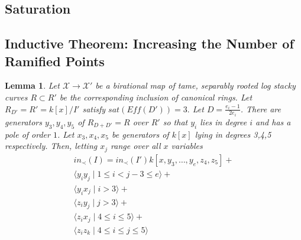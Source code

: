 \documentclass{amsart}
\theoremstyle{plain}
\newtheorem{lem}[thm]{Lemma}
\theoremstyle{definition}
\theoremstyle{remark}
\numberwithin{equation}{section}
\newcommand\ssec{\subsection}
\newcommand \sx{\mathscr X}
\newcommand \subhalf[1]{\frac{{#1} - 1}{2{#1}}}
\begin{document}
\ssec{Saturation}
\label{ssec:g_0_saturation}

\ssec{Inductive Theorem: Increasing the Number of Ramified Points}
\label{ssec:g_0_ram_pts}


\begin{lem}
\label{sat_three_induction}
Let $\sx \rightarrow \sx'$ be a birational map of tame, separably rooted  log stacky curves $R \subset R'$ be the corresponding inclusion of canonical rings. Let $R_{D'} = R' = k[x]/I'$ satisfy $sat(Eff(D')) = 3.$ Let $D = \subhalf {e_i}$. There are generators $y_3,y_4,y_5$ of $R_{D+D'}= R$ over $R'$ so that $y_i$ lies in degree $i$ and has a pole of order $1$. 
Let $x_3,x_4,x_5$ be generators of $k[x]$ lying in degrees 3,4,5 respectively.  Then, letting $x_j$ range over all $x$ variables
\begin{align*}
	in_\prec(I) = in_\prec(I')k[x,y_3,\ldots, y_e,z_4,z_5] + \\
	\langle y_i y_j \mid 1 \leq i < j-3 \leq e \rangle +\\
	\langle y_i x_j \mid i > 3 \rangle +\\
	\langle z_i y_j \mid j > 3 \rangle  +\\
	\langle z_i x_j \mid 4 \leq i \leq 5\rangle + \\
	\langle z_iz_k \mid 4 \leq i \leq j \leq 5 \rangle 
\end{align*}

\end{lem}
\end{document}
